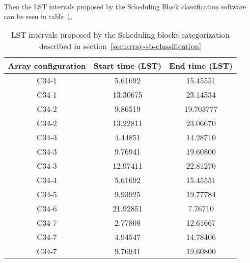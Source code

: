Then the LST intervals proposed by the Scheduling Block classification software can be seen in table~\ref{table:lst-int-prop}.

\begin{table}[h!]
\begin{center}
\begin{tabular}{|c|c|c|}
\hline
Array configuration & Start time (LST) & End time (LST) \\ \hline
C34-1 & 5.61692 & 15.45551 \\ \hline
C34-1 & 13.30675 & 23.14534 \\ \hline
C34-2 & 9.86519 & 19.703777 \\ \hline
C34-2 & 13.22811 & 23.06670 \\ \hline
C34-3 & 4.44851 & 14.28710 \\ \hline
C34-3 & 9.76941 & 19.60800 \\ \hline
C34-3 & 12.97411 & 22.81270 \\ \hline
C34-4 & 5.61692 & 15.45551 \\ \hline
C34-5 & 9.93925 & 19.77784 \\ \hline
C34-6 & 21.92851 & 7.76710 \\ \hline
C34-7 & 2.77808 & 12.61667 \\ \hline
C34-7 & 4.94547 & 14.78406 \\ \hline
C34-7 & 9.76941 & 19.60800 \\ \hline
\end{tabular}
\end{center}
\caption[LST intervals proposed by the Scheduling Blocks categorization]
{LST intervals proposed by the Scheduling blocks categorization described in section~\ref{sec:array-sb-classification}}
\label{table:lst-int-prop}
\end{table}